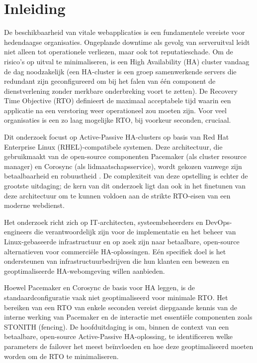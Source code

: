 
\section{Inleiding}%
\label{sec:inleiding}

De beschikbaarheid van vitale webapplicaties is een fundamentele vereiste voor hedendaagse organisaties. Ongeplande downtime als gevolg van serveruitval leidt niet alleen tot operationele verliezen, maar ook tot reputatieschade. Om de risico's op uitval te minimaliseren, is een High Availability (HA) cluster vandaag de dag noodzakelijk (een HA-cluster is een groep samenwerkende servers die redundant zijn geconfigureerd om bij het falen van één component de dienstverlening zonder merkbare onderbreking voort te zetten). De Recovery Time Objective (RTO) definieert de maximaal acceptabele tijd waarin een applicatie na een verstoring weer operationeel zou moeten zijn. Voor veel organisaties is een zo laag mogelijke RTO, bij voorkeur seconden, cruciaal.
\medskip

Dit onderzoek focust op Active-Passive HA-clusters op basis van Red Hat Enterprise Linux (RHEL)-compatibele systemen. Deze architectuur, die gebruikmaakt van de open-source componenten Pacemaker (als cluster resource manager) en Corosync (als lidmaatschapsservice), wordt gekozen vanwege zijn betaalbaarheid en robuustheid \autocite{RedHat2025}. De complexiteit van deze opstelling is echter de grootste uitdaging; de kern van dit onderzoek ligt dan ook in het finetunen van deze architectuur om te kunnen voldoen aan de strikte RTO-eisen van een moderne webdienst.
\medskip
    
Het onderzoek richt zich op IT-architecten, systeembeheerders en DevOps-engineers die verantwoordelijk zijn voor de implementatie en het beheer van Linux-gebaseerde infrastructuur en op zoek zijn naar betaalbare, open-source alternatieven voor commerciële HA-oplossingen. Eén specifiek doel is het ondersteunen van infrastructuurbedrijven die hun klanten een bewezen en geoptimaliseerde HA-webomgeving willen aanbieden.
\medskip
    
Hoewel Pacemaker en Corosync de basis voor HA leggen, is de standaardconfiguratie vaak niet geoptimaliseerd voor minimale RTO. Het bereiken van een RTO van enkele seconden vereist diepgaande kennis van de interne werking van Pacemaker en de interactie met essentiële componenten zoals STONITH (fencing). De hoofduitdaging is om, binnen de context van een betaalbare, open-source Active-Passive HA-oplossing, te identificeren welke parameters de failover het meest beïnvloeden en hoe deze geoptimaliseerd moeten worden om de RTO te minimaliseren.
\medskip
    
